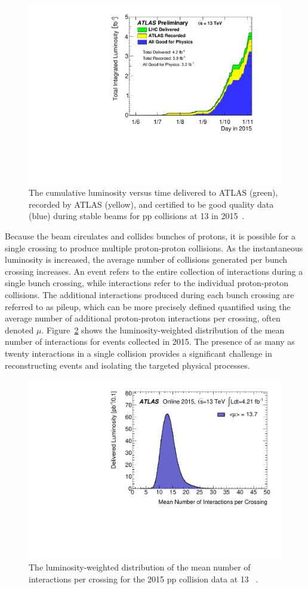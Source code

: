 \begin{figure}
\centering
\includegraphics[width=\fullfig]{figures/lumi_2015.pdf}
\caption{The cumulative luminosity versus time delivered to ATLAS (green), recorded by ATLAS (yellow), and certified to be good quality data (blue) during stable beams for pp collisions at 13 \TeV in 2015~\cite{online_lumi}.}
\label{fig:lumi_2015}
\end{figure}

Because the beam circulates and collides bunches of protons, it is possible for a single crossing to produce multiple proton-proton collisions.
As the instantaneous luminosity is increased, the average number of collisions generated per bunch crossing increases.
An event refers to the entire collection of interactions during a single bunch crossing, while interactions refer to the individual proton-proton collisions.
The additional interactions produced during each bunch crossing are referred to as pileup, which can be more precisely defined quantified using the average number of additional proton-proton interactions per crossing, often denoted $\mu$.
Figure~\ref{fig:mu_2015} shows the luminosity-weighted distribution of the mean number of interactions for events collected in 2015.
The presence of as many as twenty interactions in a single collision provides a significant challenge in reconstructing events and isolating the targeted physical processes. 

\begin{figure}
\centering
\includegraphics[width=\fullfig]{figures/mu_2015.pdf}
\caption{The luminosity-weighted distribution of the mean number of interactions per crossing for the 2015 pp collision data at 13 \TeV~\cite{online_lumi}.}
\label{fig:mu_2015}
\end{figure}
